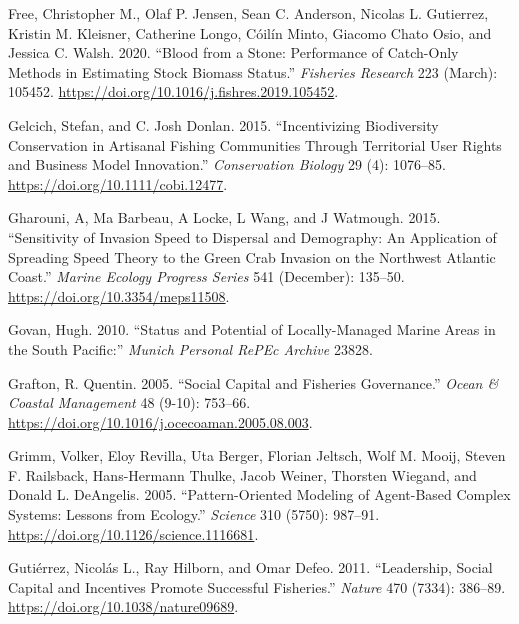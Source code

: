 \documentclass[
]{article}
\newlength{\cslhangindent}
\newlength{\cslentryspacingunit} %
\newenvironment{CSLReferences}[2] %
 {%
  \setlength{\parindent}{0pt}
  \ifodd #1
  \let\oldpar\par
  \def\par{\hangindent=\cslhangindent\oldpar}
  \fi
  \setlength{\parskip}{#2\cslentryspacingunit}
 }%
 {}
\begin{document}
\begin{CSLReferences}{1}{0}
\leavevmode{}%
Free, Christopher M., Olaf P. Jensen, Sean C. Anderson, Nicolas L. Gutierrez, Kristin M. Kleisner, Catherine Longo, Cóilín Minto, Giacomo Chato Osio, and Jessica C. Walsh. 2020. {``Blood from a Stone: {Performance} of Catch-Only Methods in Estimating Stock Biomass Status.''} \emph{Fisheries Research} 223 (March): 105452. \url{https://doi.org/10.1016/j.fishres.2019.105452}.

\leavevmode{}%
Gelcich, Stefan, and C. Josh Donlan. 2015. {``Incentivizing Biodiversity Conservation in Artisanal Fishing Communities Through Territorial User Rights and Business Model Innovation.''} \emph{Conservation Biology} 29 (4): 1076--85. \url{https://doi.org/10.1111/cobi.12477}.

\leavevmode{}%
Gharouni, A, Ma Barbeau, A Locke, L Wang, and J Watmough. 2015. {``Sensitivity of Invasion Speed to Dispersal and Demography: An Application of Spreading Speed Theory to the Green Crab Invasion on the Northwest {Atlantic} Coast.''} \emph{Marine Ecology Progress Series} 541 (December): 135--50. \url{https://doi.org/10.3354/meps11508}.

\leavevmode{}%
Govan, Hugh. 2010. {``Status and Potential of Locally-Managed Marine Areas in the {South} {Pacific}:''} \emph{Munich Personal RePEc Archive} 23828.

\leavevmode{}%
Grafton, R. Quentin. 2005. {``Social Capital and Fisheries Governance.''} \emph{Ocean \& Coastal Management} 48 (9-10): 753--66. \url{https://doi.org/10.1016/j.ocecoaman.2005.08.003}.

\leavevmode{}%
Grimm, Volker, Eloy Revilla, Uta Berger, Florian Jeltsch, Wolf M. Mooij, Steven F. Railsback, Hans-Hermann Thulke, Jacob Weiner, Thorsten Wiegand, and Donald L. DeAngelis. 2005. {``Pattern-{Oriented} {Modeling} of {Agent}-{Based} {Complex} {Systems}: {Lessons} from {Ecology}.''} \emph{Science} 310 (5750): 987--91. \url{https://doi.org/10.1126/science.1116681}.

\leavevmode{}%
Gutiérrez, Nicolás L., Ray Hilborn, and Omar Defeo. 2011. {``Leadership, Social Capital and Incentives Promote Successful Fisheries.''} \emph{Nature} 470 (7334): 386--89. \url{https://doi.org/10.1038/nature09689}.


\end{CSLReferences}
\end{document}
